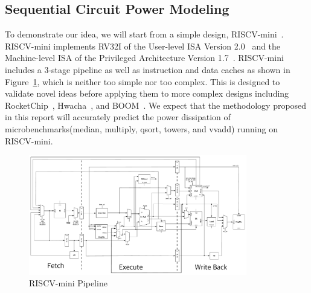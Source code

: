 \subsection{Sequential Circuit Power Modeling}
To demonstrate our idea, we will start from a simple design, RISCV-mini~\cite{riscv-mini}.
RISCV-mini implements RV32I of the User-level ISA Version 2.0~\cite{riscv-user-2.0} and
the Machine-level ISA of the Privileged Architecture Version 1.7~\cite{riscv-prev-1.7}.
RISCV-mini includes a 3-stage pipeline as well as instruction and data caches as shown
in Figure~\ref{fig:riscv_mini}, which is neither too simple nor too complex. This is designed
to validate novel ideas before applying them to more complex designs including
RocketChip~\cite{RocketChip}, Hwacha~\cite{Hwacha}, and BOOM~\cite{BOOM}.
We expect that the methodology proposed in this report will accurately predict
the power dissipation of microbenchmarks(median, multiply, qsort, towers, and vvadd) running on RISCV-mini.

\begin{figure}
	\centering
	\includegraphics[width=0.85\textwidth,height=\textheight,keepaspectratio]{images/riscv_mini.pdf}
	\caption{RISCV-mini Pipeline}
	\label{fig:riscv_mini}
\end{figure}